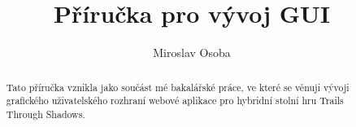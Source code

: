 \documentclass[12pt,a4paper]{article}
\title{Příručka pro vývoj GUI}
\author{Miroslav Osoba}
\begin{document}
\maketitle %

\begin{abstract}
  Tato příručka vznikla jako součást mé bakalářské práce, ve které se věnuji vývoji grafického uživatelského rozhraní webové aplikace pro hybridní stolní hru Trails Through Shadows.
\end{abstract}

\tableofcontents %

\newpage

\end{document}
